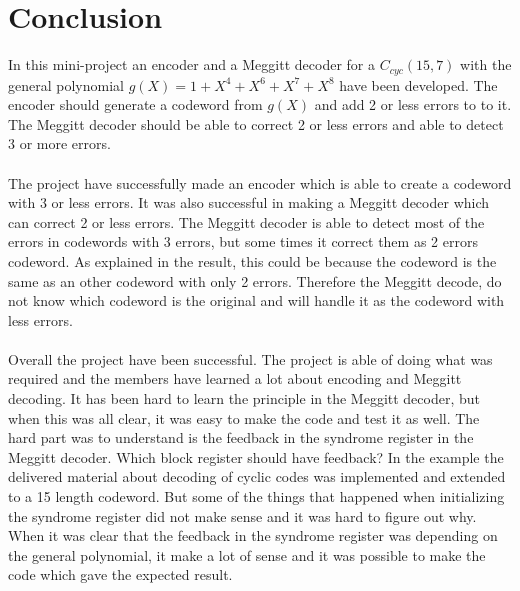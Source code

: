 \documentclass[Main]{subfiles}
\begin{document}
\section{Conclusion}
In this mini-project an encoder and a Meggitt decoder for a $C_{cyc}(15,7)$ with the general polynomial $g(X)=1+X^4+X^6+X^7+X^8$ have been developed.
The encoder should generate a codeword from $g(X)$ and add 2 or less errors to to it.
The Meggitt decoder should be able to correct 2 or less errors and able to detect 3 or more errors.
\\
\\
The project have successfully made an encoder which is able to create a codeword with 3 or less errors.
It was also successful in making a Meggitt decoder which can  correct 2 or less errors.
The Meggitt decoder is able to detect most of the errors in codewords with 3 errors, but some times it correct them as 2 errors codeword.
As explained in the result, this could be because the codeword is the same as an other codeword with only 2 errors.
Therefore the Meggitt decode, do not know which codeword is the original and will handle it as the codeword with less errors.  
\\
\\
Overall the project have been successful.
The project is able of doing what was required and the members have learned a lot about encoding and Meggitt decoding.
It has been hard to learn the principle in the Meggitt decoder, but when this was all clear, it was easy to make the code and test it as well.
The hard part was to understand is the feedback in the syndrome register in the Meggitt decoder.
Which block register should have feedback?
In the example the delivered material about decoding of cyclic codes was implemented and extended to a 15 length codeword.
But some of the things that happened when initializing the syndrome register did not make sense and it was hard to figure out why.
When it was clear that the feedback in the syndrome register was depending on the general polynomial, it make a lot of sense and it was possible to make the code which gave the expected result.
\end{document}
